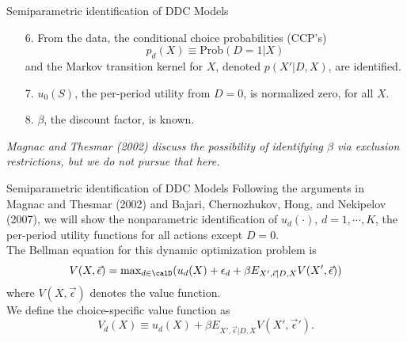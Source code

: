 \begin{frame}{Semiparametric identification of DDC Models}
\begin{enumerate}
\item[6.] From the data, the \alert{conditional choice probabilities (CCP's)}  $$p_d(X) \equiv \text{Prob}(D=1|X)$$ and the Markov transition kernel for $X$, denoted $p(X'|D,X)$, are identified. 
\item[7.] $u_0(S)$, the per-period utility from $D = 0$, is normalized zero, for all $X$. \\
\item[8.] $\beta$, the discount factor, is known.
\end{enumerate}
\textit{Magnac and Thesmar (2002) discuss the possibility of identifying $\beta$ via exclusion restrictions, but we do not pursue that here.}
\end{frame}


\begin{frame}{Semiparametric identification of DDC Models}
Following the arguments in Magnac and Thesmar (2002) and Bajari, Chernozhukov, Hong, and Nekipelov (2007), we will show the nonparametric identification of $u_d(\cdot)$, $d = 1, \cdots , K$, the per-period utility functions for all actions except $D=0$.\\
\vspace{3mm}
The Bellman equation for this dynamic optimization problem is 
\begin{equation*}
V(X, \vec{\epsilon}) = \text{max}_{d \in \calD} ( u_d(X) + \epsilon_d + \beta E_{X', \vec{\epsilon} | D, X} V(X', \vec{\epsilon}))
\end{equation*}
where $V(X, \vec{\epsilon})$ denotes the value function. \\
\vspace{0.5cm}
We define the choice-specific value function as
\begin{equation*}
V_d(X) \equiv u_d(X) + \beta E_{X', \vec{\epsilon}|D, X} V(X', \vec{\epsilon}').
\end{equation*}

\end{frame}



